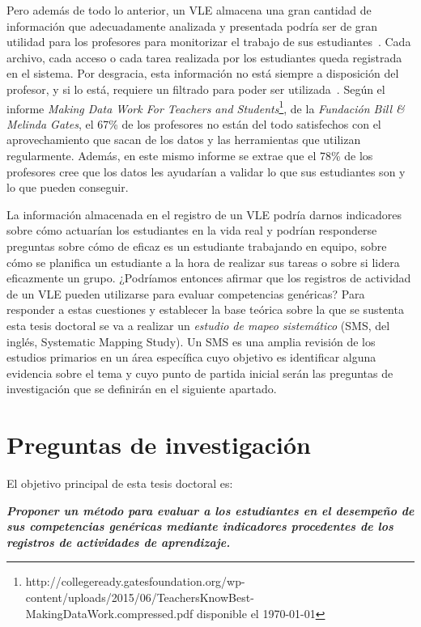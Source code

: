 Pero además de todo lo anterior, un VLE almacena una gran cantidad de información que adecuadamente analizada y presentada podría ser de gran utilidad para los profesores para monitorizar el trabajo de sus estudiantes~\cite{podgorelec:2011}. Cada archivo, cada acceso o cada tarea realizada por los estudiantes queda registrada en el sistema. Por desgracia, esta información no está siempre a disposición del profesor, y si lo está, requiere un filtrado para poder ser utilizada~\cite{Chebil:2012}. Según el informe \emph{Making Data Work For Teachers and Students}\footnote{http://collegeready.gatesfoundation.org/wp-content/uploads/2015/06/TeachersKnowBest-MakingDataWork.compressed.pdf disponible el \today}, de la \emph{Fundación Bill \& Melinda Gates}, el 67\% de los profesores no están del todo satisfechos con el aprovechamiento que sacan de los datos y las herramientas que utilizan regularmente. Además, en este mismo informe se extrae que el 78\% de los profesores cree que los datos les ayudarían a validar lo que sus estudiantes son y lo que pueden conseguir.   

La información almacenada en el registro de un VLE podría darnos indicadores sobre cómo actuarían los estudiantes en la vida real y podrían responderse preguntas sobre cómo de eficaz es un estudiante trabajando en equipo, sobre cómo se planifica un estudiante a la hora de realizar sus tareas o sobre si lidera eficazmente un grupo. ¿Podríamos entonces afirmar que los registros de actividad de un VLE pueden utilizarse para evaluar competencias genéricas? Para responder a estas cuestiones y establecer la base teórica sobre la que se sustenta esta tesis doctoral se va a realizar un \emph{estudio de mapeo sistemático} (SMS, del inglés, Systematic Mapping Study). Un SMS es una amplia revisión de los estudios primarios en un área específica cuyo objetivo es identificar alguna evidencia sobre el tema y cuyo punto de partida inicial serán las preguntas de investigación que se definirán en el siguiente apartado.

\section{Preguntas de investigación}

El objetivo principal de esta tesis doctoral es:

\bigskip
\textbf{\emph{Proponer un método para evaluar a los estudiantes en el desempeño de sus competencias genéricas mediante indicadores procedentes de los registros de actividades de aprendizaje.}}
\bigskip

